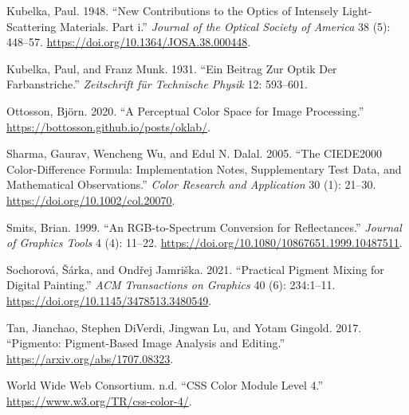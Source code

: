 \documentclass[
  10pt,
  twocolumn]{article}
\newlength{\cslhangindent}
\newlength{\cslentryspacingunit} %
\newenvironment{CSLReferences}[2] %
 {%
  \setlength{\parindent}{0pt}
  \ifodd #1
  \let\oldpar\par
  \def\par{\hangindent=\cslhangindent\oldpar}
  \fi
  \setlength{\parskip}{#2\cslentryspacingunit}
 }%
 {}
\begin{document}
\begin{CSLReferences}{1}{0}
\leavevmode{}%
Kubelka, Paul. 1948. {``New Contributions to the Optics of Intensely
Light-Scattering Materials. Part i.''} \emph{Journal of the Optical
Society of America} 38 (5): 448--57.
\url{https://doi.org/10.1364/JOSA.38.000448}.

\leavevmode{}%
Kubelka, Paul, and Franz Munk. 1931. {``Ein Beitrag Zur Optik Der
Farbanstriche.''} \emph{Zeitschrift f{ü}r Technische Physik} 12:
593--601.

\leavevmode{}%
Ottosson, Björn. 2020. {``A Perceptual Color Space for Image
Processing.''} \url{https://bottosson.github.io/posts/oklab/}.

\leavevmode{}%
Sharma, Gaurav, Wencheng Wu, and Edul N. Dalal. 2005. {``The {CIEDE2000}
Color-Difference Formula: Implementation Notes, Supplementary Test Data,
and Mathematical Observations.''} \emph{Color Research and Application}
30 (1): 21--30. \url{https://doi.org/10.1002/col.20070}.

\leavevmode{}%
Smits, Brian. 1999. {``An {RGB}-to-Spectrum Conversion for
Reflectances.''} \emph{Journal of Graphics Tools} 4 (4): 11--22.
\url{https://doi.org/10.1080/10867651.1999.10487511}.

\leavevmode{}%
Sochorová, Šárka, and Ondřej Jamriška. 2021. {``Practical Pigment Mixing
for Digital Painting.''} \emph{ACM Transactions on Graphics} 40 (6):
234:1--11. \url{https://doi.org/10.1145/3478513.3480549}.

\leavevmode{}%
Tan, Jianchao, Stephen DiVerdi, Jingwan Lu, and Yotam Gingold. 2017.
{``Pigmento: Pigment-Based Image Analysis and Editing.''}
\url{https://arxiv.org/abs/1707.08323}.

\leavevmode{}%
World Wide Web Consortium. n.d. {``{CSS} Color Module Level 4.''}
\url{https://www.w3.org/TR/css-color-4/}.

\end{CSLReferences}
\end{document}
